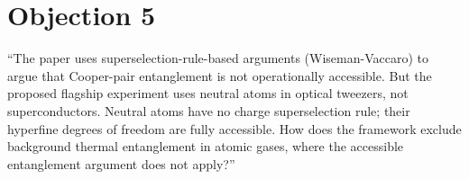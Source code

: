 \documentclass[11pt,letterpaper]{article}
\begin{document}
\section*{Objection 5}

\begin{tcolorbox}[breakable,enhanced,colback=red!3,colframe=red!60!black,
  fonttitle=\bfseries,title={Referee Objection 5: The superselection rule argument does not apply to neutral atoms},
  boxrule=0.8pt]
``The paper uses superselection-rule-based arguments (Wiseman-Vaccaro) to argue that
Cooper-pair entanglement is not operationally accessible.  But the proposed flagship
experiment uses neutral atoms in optical tweezers, not superconductors.  Neutral atoms
have no charge superselection rule; their hyperfine degrees of freedom are fully accessible.
How does the framework exclude background thermal entanglement in atomic gases, where
the accessible entanglement argument does not apply?''
\end{tcolorbox}
\end{document}
